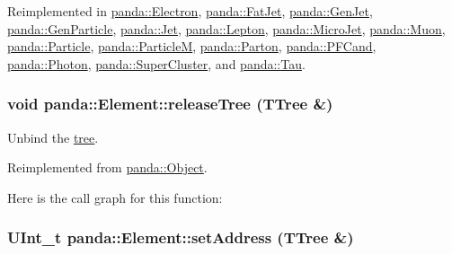 Reimplemented in \hyperlink{classpanda_1_1Electron_adf667b212f1ea11094dd276fd913c4f6}{panda::Electron}, \hyperlink{classpanda_1_1FatJet_a20e4f6ca23c2a9a603c33e7f023337fe}{panda::FatJet}, \hyperlink{classpanda_1_1GenJet_aeaa1c9ce79a2ac5e7d49ff5ea1e34136}{panda::GenJet}, \hyperlink{classpanda_1_1GenParticle_a46eed568bb72468ccda95c09002ea6a5}{panda::GenParticle}, \hyperlink{classpanda_1_1Jet_a06509e069beffe7d5fa12a5450254e6a}{panda::Jet}, \hyperlink{classpanda_1_1Lepton_a24b1cd552930db2af2734d3acbb27257}{panda::Lepton}, \hyperlink{classpanda_1_1MicroJet_a9375dd6d13362ae323e9915b529458e8}{panda::MicroJet}, \hyperlink{classpanda_1_1Muon_a2f91424e93572f9efd189884d95efaf6}{panda::Muon}, \hyperlink{classpanda_1_1Particle_a8c4fabfceb39b746b0e68a7389e662c4}{panda::Particle}, \hyperlink{classpanda_1_1ParticleM_a37f7be4e1150b6080b47b005af730af5}{panda::ParticleM}, \hyperlink{classpanda_1_1Parton_a0def202110cf69ff7d9213cbf9db02ec}{panda::Parton}, \hyperlink{classpanda_1_1PFCand_ad32d7ae95ef68eb076604648684aca06}{panda::PFCand}, \hyperlink{classpanda_1_1Photon_aa747baa897eca18a06d897063402a966}{panda::Photon}, \hyperlink{classpanda_1_1SuperCluster_aba3e69a83bfcc68189c9c94e8dd36ba9}{panda::SuperCluster}, and \hyperlink{classpanda_1_1Tau_a1482f04be4fffde6b5c648ae3e7b539f}{panda::Tau}.\hypertarget{classpanda_1_1Element_a526ce926da6ed144bcf41a43e906f91b}{
\subsubsection[{releaseTree}]{\setlength{\rightskip}{0pt plus 5cm}void panda::Element::releaseTree (TTree \&)}}
\label{classpanda_1_1Element_a526ce926da6ed144bcf41a43e906f91b}


Unbind the \hyperlink{namespacepanda_1_1tree}{tree}. 

Reimplemented from \hyperlink{classpanda_1_1Object_aaf58438092b42a89b838ce12c6a23833}{panda::Object}.

Here is the call graph for this function:\hypertarget{classpanda_1_1Element_a0f4c9e587ee4c4ccbc27b76b06adbc80}{
\subsubsection[{setAddress}]{\setlength{\rightskip}{0pt plus 5cm}UInt\_\-t panda::Element::setAddress (TTree \&)}}
\label{classpanda_1_1Element_a0f4c9e587ee4c4ccbc27b76b06adbc80}


